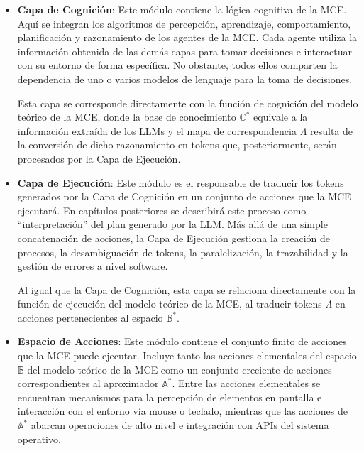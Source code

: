 \begin{itemize}

    \item \textbf{Capa de Cognición}: Este módulo contiene la lógica cognitiva
    de la MCE. Aquí se integran los algoritmos de percepción, aprendizaje,
    comportamiento, planificación y razonamiento de los agentes de la MCE. Cada
    agente utiliza la información obtenida de las demás capas para tomar
    decisiones e interactuar con su entorno de forma específica. No obstante,
    todos ellos comparten la dependencia de uno o varios modelos de lenguaje
    para la toma de decisiones.
    
    Esta capa se corresponde directamente con la función de cognición del modelo 
    teórico de la MCE, donde la base de
    conocimiento \(\mathbb{C}^*\) equivale a la información extraída de los LLMs y
    el mapa de correspondencia \(\Lambda\) resulta de la conversión de dicho
    razonamiento en tokens que, posteriormente, serán procesados por la Capa de
    Ejecución.

    \item \textbf{Capa de Ejecución}: Este módulo es el responsable de traducir
    los tokens generados por la Capa de Cognición en un conjunto de acciones que
    la MCE ejecutará. En capítulos posteriores se describirá este proceso como
    “interpretación” del plan generado por la LLM. Más allá de una simple
    concatenación de acciones, la Capa de Ejecución gestiona la creación de
    procesos, la desambiguación de tokens, la paralelización, la trazabilidad y
    la gestión de errores a nivel software. 
    
    Al igual que la Capa de Cognición,
    esta capa se relaciona directamente con la función de ejecución del modelo
    teórico de la MCE, al traducir tokens \(\Lambda\) en acciones pertenecientes
    al espacio \(\mathbb{B}^*\).

    \item \textbf{Espacio de Acciones}: Este módulo contiene el conjunto finito
    de acciones que la MCE puede ejecutar. Incluye tanto las acciones
    elementales del espacio \(\mathbb{B}\) del modelo teórico de la MCE como un
    conjunto creciente de acciones correspondientes al aproximador
    \(\mathbb{A}^*\). Entre las acciones elementales se encuentran mecanismos
    para la percepción de elementos en pantalla e interacción con el entorno vía
    mouse o teclado, mientras que las acciones de \(\mathbb{A}^*\) abarcan
    operaciones de alto nivel e integración con APIs del sistema operativo. 


\end{itemize}
